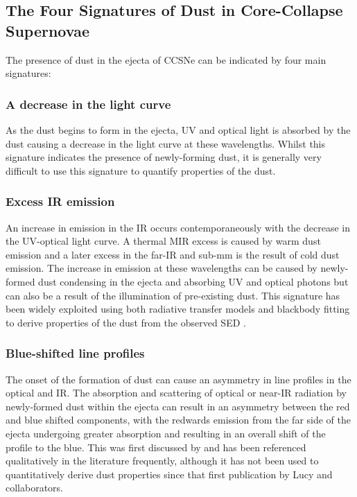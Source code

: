 
\subsection{The Four Signatures of Dust in Core-Collapse Supernovae}
\label{three_sigs}


The presence of dust in the ejecta of CCSNe can be indicated by four main signatures: 

\subsubsection{A decrease in the light curve} 
As the dust begins to form in the ejecta, UV and optical light is absorbed by the dust causing a decrease in the light curve at these wavelengths.  Whilst this signature indicates the presence of newly-forming dust, it is generally very difficult to use this signature to quantify properties of the dust.

\subsubsection{Excess IR emission}
An increase in emission in the IR occurs contemporaneously with the decrease in the UV-optical light curve.  A thermal MIR excess is caused by warm dust emission and a later excess in the far-IR and sub-mm is the result of cold dust emission.  The increase in emission at these wavelengths can be caused by newly-formed dust condensing in the ejecta and absorbing UV and optical photons but can also be a result of the illumination of pre-existing dust.  This signature has been widely exploited using both radiative transfer models and blackbody fitting to derive properties of the dust from the observed SED \citep{Wooden1993}.

\subsubsection{Blue-shifted line profiles}
The onset of the formation of dust can cause an asymmetry in line profiles in the optical and IR.  The absorption and scattering of optical or near-IR radiation by newly-formed dust within the ejecta can result in an asymmetry between the red and blue shifted components, with the redwards 
emission from the far side of the ejecta undergoing greater absorption and resulting in an overall shift of the profile to the blue.  This was first discussed by \citet{Lucy1989} and has been referenced qualitatively in the literature frequently, although it has not been used to quantitatively derive dust properties since that first publication by Lucy and collaborators.

